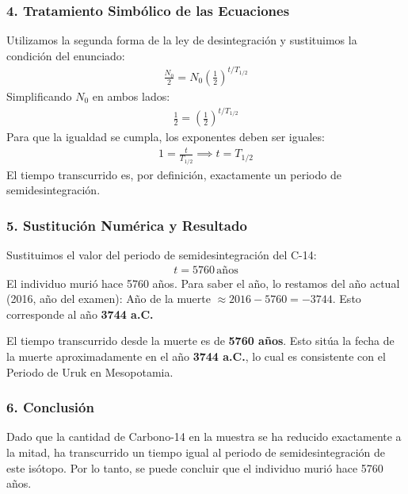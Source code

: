 \subsubsection*{4. Tratamiento Simbólico de las Ecuaciones}
Utilizamos la segunda forma de la ley de desintegración y sustituimos la condición del enunciado:
\begin{gather}
    \frac{N_0}{2} = N_0 \left(\frac{1}{2}\right)^{t/T_{1/2}}
\end{gather}
Simplificando $N_0$ en ambos lados:
\begin{gather}
    \frac{1}{2} = \left(\frac{1}{2}\right)^{t/T_{1/2}}
\end{gather}
Para que la igualdad se cumpla, los exponentes deben ser iguales:
\begin{gather}
    1 = \frac{t}{T_{1/2}} \implies t = T_{1/2}
\end{gather}
El tiempo transcurrido es, por definición, exactamente un periodo de semidesintegración.

\subsubsection*{5. Sustitución Numérica y Resultado}
Sustituimos el valor del periodo de semidesintegración del C-14:
\begin{gather}
    t = 5760\,\text{años}
\end{gather}
El individuo murió hace 5760 años. Para saber el año, lo restamos del año actual (2016, año del examen):
Año de la muerte $\approx 2016 - 5760 = -3744$.
Esto corresponde al año \textbf{3744 a.C.}
\begin{cajaresultado}
El tiempo transcurrido desde la muerte es de \textbf{5760 años}. Esto sitúa la fecha de la muerte aproximadamente en el año \textbf{3744 a.C.}, lo cual es consistente con el Periodo de Uruk en Mesopotamia.
\end{cajaresultado}

\subsubsection*{6. Conclusión}
\begin{cajaconclusion}
Dado que la cantidad de Carbono-14 en la muestra se ha reducido exactamente a la mitad, ha transcurrido un tiempo igual al periodo de semidesintegración de este isótopo. Por lo tanto, se puede concluir que el individuo murió hace 5760 años.
\end{cajaconclusion}


